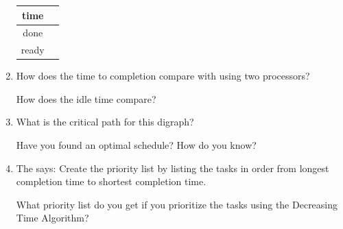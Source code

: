 \documentclass[12pt]{article}
\begin{document}
\begin{enumerate}

\hspace*{-1in}	\begin{tabular}{c || c}
time &   \quad \hspace{6in} \quad \\ \hline
done& \\ \hline
ready& \\ \hline
\end{tabular}

\hspace*{-2cm}

\item How does the time to completion compare with using two processors?

\vspace{.5cm}

How does the idle time compare? \vspace{.5cm}

\item What is the critical path for this digraph? \hrulefill

Have you found an optimal schedule? How do you know?

\vspace{1cm}

\item 
\begin{adjustbox}{valign=t,minipage={.4\textwidth}}
The  says: Create the priority list by listing the tasks in order from longest completion time to shortest completion time.
\end{adjustbox}
\hfill
\begin{adjustbox}{valign=t,minipage={.4\textwidth}}
\mydigraph
\end{adjustbox}




 What priority list do you get if you prioritize the tasks using the Decreasing Time Algorithm?


\end{enumerate}
\end{document}
